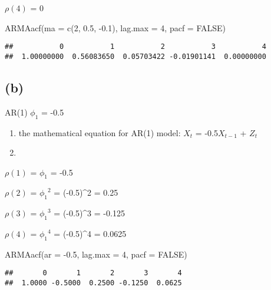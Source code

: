 \documentclass[
]{article}
\newenvironment{Shaded}{\begin{snugshade}}{\end{snugshade}}
\newcommand{\AttributeTok}[1]{\textcolor[rgb]{0.77,0.63,0.00}{#1}}
\newcommand{\ConstantTok}[1]{\textcolor[rgb]{0.00,0.00,0.00}{#1}}
\newcommand{\DecValTok}[1]{\textcolor[rgb]{0.00,0.00,0.81}{#1}}
\newcommand{\FloatTok}[1]{\textcolor[rgb]{0.00,0.00,0.81}{#1}}
\newcommand{\FunctionTok}[1]{\textcolor[rgb]{0.00,0.00,0.00}{#1}}
\newcommand{\NormalTok}[1]{#1}
\newcommand{\SpecialCharTok}[1]{\textcolor[rgb]{0.00,0.00,0.00}{#1}}
\begin{document}
\(\rho(4)\) = 0

\begin{Shaded}
\begin{Highlighting}[]
\FunctionTok{ARMAacf}\NormalTok{(}\AttributeTok{ma =} \FunctionTok{c}\NormalTok{(}\DecValTok{2}\NormalTok{, }\FloatTok{0.5}\NormalTok{, }\SpecialCharTok{{-}}\FloatTok{0.1}\NormalTok{), }\AttributeTok{lag.max =} \DecValTok{4}\NormalTok{, }\AttributeTok{pacf =} \ConstantTok{FALSE}\NormalTok{)}
\end{Highlighting}
\end{Shaded}

\begin{verbatim}
##           0           1           2           3           4 
##  1.00000000  0.56083650  0.05703422 -0.01901141  0.00000000
\end{verbatim}

\hypertarget{b-1}{%
\subsection{(b)}\label{b-1}}

AR(1) \(\phi_1\) = -0.5

\begin{enumerate}
\def\labelenumi{(\arabic{enumi})}
\item
  the mathematical equation for AR(1) model: \(X_t\) = -0.5\(X_{t-1}\) +
  \(Z_t\)
\item
\end{enumerate}

\(\rho(1)\) = \(\phi_1\) = -0.5

\(\rho(2)\) = \({\phi_1}^2\) = (-0.5)\^{}2 = 0.25

\(\rho(3)\) = \({\phi_1}^3\) = (-0.5)\^{}3 = -0.125

\(\rho(4)\) = \({\phi_1}^4\) = (-0.5)\^{}4 = 0.0625

\begin{Shaded}
\begin{Highlighting}[]
\FunctionTok{ARMAacf}\NormalTok{(}\AttributeTok{ar =} \SpecialCharTok{{-}}\FloatTok{0.5}\NormalTok{, }\AttributeTok{lag.max =} \DecValTok{4}\NormalTok{, }\AttributeTok{pacf =} \ConstantTok{FALSE}\NormalTok{)}
\end{Highlighting}
\end{Shaded}

\begin{verbatim}
##       0       1       2       3       4 
##  1.0000 -0.5000  0.2500 -0.1250  0.0625
\end{verbatim}
\end{document}
